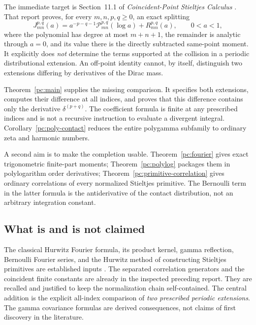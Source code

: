 \documentclass[11pt,a4paper]{article}
\numberwithin{equation}{section}
\theoremstyle{definition}
\begin{document}
The immediate target is Section~11.1 of \emph{Coincident-Point Stieltjes Calculus} \cite{pc:coincident}. That report proves, for every $m,n,p,q\ge0$, an exact splitting
\begin{equation}\label{pc:prior-split}
J_{mn}^{p,q}(a)=a^{-p-q-1}\mathcal P_{mn}^{p,q}(\log a)+R_{mn}^{p,q}(a),\qquad 0<a<1,
\end{equation}
where the polynomial has degree at most $m+n+1$, the remainder is analytic through $a=0$, and its value there is the directly subtracted same-point moment. It explicitly does \emph{not} determine the terms supported at the collision in a periodic distributional extension. An off-point identity cannot, by itself, distinguish two extensions differing by derivatives of the Dirac mass.

Theorem~\ref{pc:main} supplies the missing comparison. It specifies both extensions, computes their difference at all indices, and proves that this difference contains only the derivative $\delta^{(p+q)}$. The coefficient formula is finite at any prescribed indices and is not a recursive instruction to evaluate a divergent integral. Corollary~\ref{pc:poly-contact} reduces the entire polygamma subfamily to ordinary zeta and harmonic numbers.

A second aim is to make the completion usable. Theorem~\ref{pc:fourier} gives exact trigonometric finite-part moments; Theorem~\ref{pc:polylog} packages them in polylogarithm order derivatives; Theorem~\ref{pc:primitive-correlation} gives ordinary correlations of every normalized Stieltjes primitive. The Bernoulli term in the latter formula is the antiderivative of the contact distribution, not an arbitrary integration constant.

\subsection{What is and is not claimed}
The classical Hurwitz Fourier formula, its product kernel, gamma reflection, Bernoulli Fourier series, and the Hurwitz method of constructing Stieltjes primitives are established inputs \cite{pc:EM,pc:hurwitz,pc:gamma,pc:bernoulli}. The separated correlation generators and the coincident finite constants are already in the inspected preceding report. They are recalled and justified to keep the normalization chain self-contained. The central addition is the explicit all-index comparison of \emph{two prescribed periodic extensions}. The gamma covariance formulas are derived consequences, not claims of first discovery in the literature.
\end{document}
